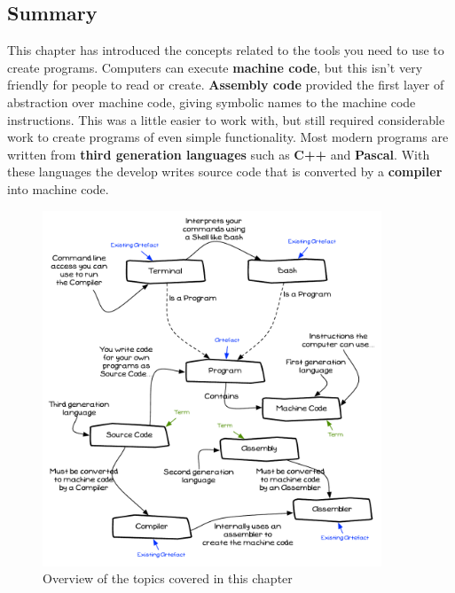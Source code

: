 \clearpage
\subsection{Summary} %
\label{sub:compilers_summary}

This chapter has introduced the concepts related to the tools you need to use to create programs. Computers can execute \textbf{machine code}, but this isn't very friendly for people to read or create. \textbf{Assembly code} provided the first layer of abstraction over machine code, giving symbolic names to the machine code instructions. This was a little easier to work with, but still required considerable work to create programs of even simple functionality. Most modern programs are written from \textbf{third generation languages} such as \textbf{C++} and \textbf{Pascal}. With these languages the develop writes source code that is converted by a \textbf{compiler} into machine code.

\begin{figure}[h]
   \centering
   \includegraphics[width=0.9\textwidth]{./topics/programs-and-compilers/diagrams/Summary} 
   \caption{Overview of the topics covered in this chapter}
   \label{fig:compilers_summary}
\end{figure}


